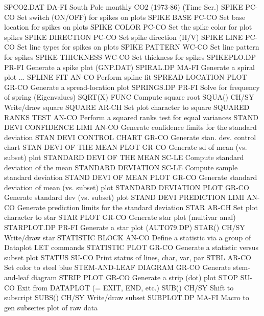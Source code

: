 SPCO2.DAT                   DA-FI South Pole monthly CO2 (1973-86) (Time Ser.)
SPIKE                       PC-CO Set switch (ON/OFF) for spikes on plots
SPIKE BASE                  PC-CO Set base location for spikes on plots
SPIKE COLOR                 PC-CO Set the spike color for plot spikes
SPIKE DIRECTION             PC-CO Set spike direction (H/V)
SPIKE LINE                  PC-CO Set line types for spikes on plots
SPIKE PATTERN               WC-CO Set line pattern for spikes
SPIKE THICKNESS             WC-CO Set thickness for spikes
SPIKEPLO.DP                 PR-FI Generate a spike plot (GNP.DAT)
SPIRAL.DP                   MA-FI Generate a spiral plot
... SPLINE FIT              AN-CO Perform spline fit
SPREAD LOCATION PLOT        GR-CO Generate a spread-location plot
SPRINGS.DP                  PR-FI Solve for frequency of spring (Eigenvalues)
SQRT(X)                     FUNC  Compute square root
SQUA()                      CH/SY Write/draw square
SQUARE                      AR-CH Set plot character to square
SQUARED RANKS TEST          AN-CO Perform a squared ranks test for equal variances
STAND DEVI CONFIDENCE LIMI  AN-CO Generate confidence limits for the standard deviation
STAN DEVI CONTROL CHART     GR-CO Generate stan. dev. control chart
STAN DEVI OF THE MEAN PLOT  GR-CO Generate sd of mean (vs. subset) plot
STANDARD DEVI OF THE MEAN   SC-LE Compute standard deviation of the mean
STANDARD DEVIATION          SC-LE Compute sample standard deviation
STAND DEVI OF MEAN PLOT     GR-CO Generate standard deviation of mean (vs. subset) plot
STANDARD DEVIATION PLOT     GR-CO Generate standard dev (vs. subset) plot
STAND DEVI PREDICTION LIMI  AN-CO Generate prediction limits for the standard deviation
STAR                        AR-CH Set plot character to star
STAR PLOT                   GR-CO Generate star plot (multivar anal)
STARPLOT.DP                 PR-FI Generate a star plot (AUTO79.DP)
STAR()                      CH/SY Write/draw star
STATISTIC BLOCK             AN-CO Define a statistic via a group of Dataplot LET commands
STATISTIC PLOT              GR-CO Generate a statistic versus subset plot
STATUS                      SU-CO Print status of lines, char, var, par
STBL                        AR-CO Set color to steel blue
STEM-AND-LEAF DIAGRAM       GR-CO Generate stem-and-leaf diagram
STRIP PLOT                  GR-CO Generate a strip (dot) plot
STOP                        SU-CO Exit from DATAPLOT (= EXIT, END, etc.)
SUB()                       CH/SY Shift to subscript
SUBS()                      CH/SY Write/draw subset
SUBPLOT.DP                  MA-FI Macro to gen subseries plot of raw data

